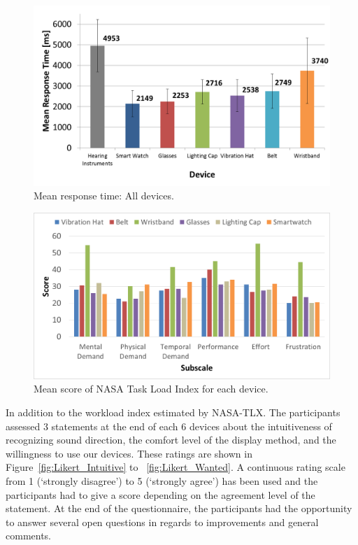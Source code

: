 \documentclass{sigchi}
\begin{document}
\begin{figure}[!t]
\centering
\includegraphics[width=\columnwidth]{All_RT}
\caption{Mean response time: All devices.}
\label{fig:All_RT}
\end{figure}

\begin{figure}[!t]
\centering
\includegraphics[width=\columnwidth]{nasa_tlx}
\caption{Mean score of NASA Task Load Index for each device.}
\label{fig:nasa_tlx}
\end{figure}

In addition to the workload index estimated by NASA-TLX. The participants assessed 3 statements at the end of each 6 devices about the intuitiveness of recognizing sound direction, the comfort level of the display method, and the willingness to use our devices. These ratings are shown in Figure~\ref{fig:Likert_Intuitive} to ~\ref{fig:Likert_Wanted}. A continuous rating scale from 1 (\textquoteleft strongly disagree\textquoteright) to 5 (\textquoteleft strongly agree\textquoteright) has been used and the participants had to give a score depending on the agreement level of the statement. At the end of the questionnaire, the participants had the opportunity to answer several open questions in regards to improvements and general comments.
\end{document}
